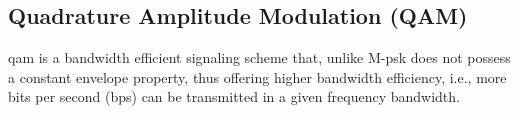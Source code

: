 
\subsection{Quadrature Amplitude Modulation (QAM)}
\gls{qam} is a bandwidth efficient signaling scheme that, unlike M-\gls{psk} does not possess a
constant envelope property, thus offering higher bandwidth efficiency, i.e., more bits per second (bps) can be transmitted in a given frequency bandwidth. 






